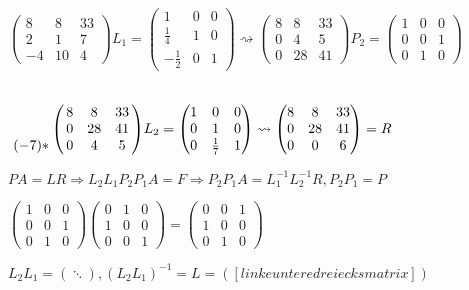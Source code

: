 \documentclass[12pt,a4paper]{article} %
\begin{document}
	$\begin{pmatrix}
		8 & 8 & 33 \\
		2 & 1 & 7 \\
		-4 & 10 & 4
	\end{pmatrix}
	L_1 = \begin{pmatrix}
		1 & 0 & 0 \\
		\frac{1}{4} & 1 & 0 \\
		-\frac{1}{2} & 0 & 1
	\end{pmatrix}
	\rightsquigarrow
	\begin{pmatrix}
		8 & 8 & 33 \\
		0 & 4 & 5 \\
		0 & 28 & 41
	\end{pmatrix}
	P_2 = \begin{pmatrix}
		1 & 0 & 0 \\
		0 & 0 & 1 \\
		0 & 1 & 0
	\end{pmatrix}$
	
	$\bordermatrix{ ~ & & & \cr
		& 8 & 8 & 33 \cr
		& 0 & 28 & 41 \cr
		(-7) * & 0 & 4 & 5
	}
	L_2 = \begin{pmatrix}
	1 & 0 & 0 \\
	0 & 1 & 0 \\
	0 & \frac{1}{7} & 1
	\end{pmatrix}
	\rightsquigarrow
	\begin{pmatrix}
		8 & 8 & 33 \\
		0 & 28 & 41 \\
		0 & 0 & 6
	\end{pmatrix}
	 = R$
	
	$PA = LR \Rightarrow L_2L_1 P_2P_1 A = F \Rightarrow P_2P_1A = L_1^{-1}L_2^{-1}R, P_2P_1 = P$
	
	$\begin{pmatrix}
		1 & 0 & 0 \\
		0 & 0 & 1 \\
		0 & 1 & 0
	\end{pmatrix}
	\begin{pmatrix}
		0 & 1 & 0 \\
		1 & 0 & 0 \\
		0 & 0 & 1
	\end{pmatrix}
	=
	\begin{pmatrix}
		0 & 0 & 1 \\
		1 & 0 & 0 \\
		0 & 1 & 0
	\end{pmatrix}$
	
	$L_2L_1 = (\ddots), (L_2L_1)^{-1} = L = ([linke untere dreiecks matrix])$
	
\end{document}
